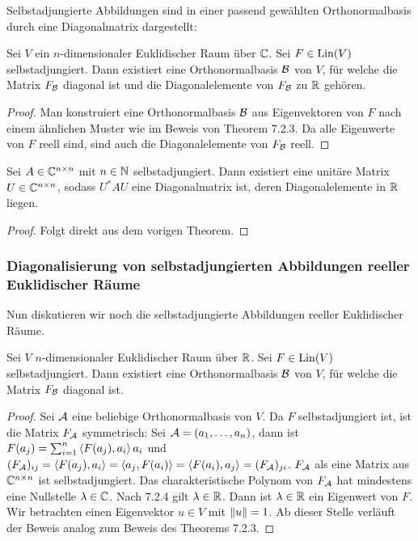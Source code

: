 Selbstadjungierte Abbildungen sind in einer passend gewählten Orthonormalbasis durch eine Diagonalmatrix dargestellt: 

\begin{thm}
	Sei $ V $ ein $ n $-dimensionaler Euklidischer Raum über $ \mathbb C $. Sei $ F \in \operatorname{Lin}(V) $ selbstadjungiert. Dann existiert eine Orthonormalbasis $ \mathcal{B} $ von $ V $, für welche die Matrix $ F_{\mathcal{B}} $ diagonal ist und die Diagonalelemente von $ F_{\mathcal{B}} $ zu $ \mathbb R $ gehören.
\end{thm}
\begin{proof}
	Man konstruiert eine Orthonormalbasis $ \mathcal{B} $ aus Eigenvektoren von $ F $ nach einem ähnlichen Muster wie im Beweis von Theorem 7.2.3. %
	Da alle Eigenwerte von $ F $ reell sind, sind auch die Diagonalelemente von $ F_{\mathcal{B}} $ reell.
\end{proof}

\begin{klr}
	Sei $ A \in \mathbb C^{n \times n} $ mit $ n \in \mathbb N $ selbstadjungiert. Dann existiert eine unitäre Matrix $ U \in \mathbb C^{n \times n} $, sodass $ U^\ast A U $ eine Diagonalmatrix ist, deren Diagonalelemente in $ \mathbb R $ liegen.
\end{klr}
\begin{proof}
	Folgt direkt aus dem vorigen Theorem.
\end{proof}

\subsubsection{Diagonalisierung von selbstadjungierten Abbildungen reeller Euklidischer Räume}

Nun diskutieren wir noch die selbstadjungierte Abbildungen reeller Euklidischer Räume. %

\begin{thm}
	Sei $ V $ $ n $-dimensionaler Euklidischer Raum über $ \mathbb R $. Sei $ F \in \operatorname{Lin}(V) $ selbstadjungiert. Dann existiert eine Orthonormalbasis $ \mathcal{B} $ von $ V $, für welche die Matrix $ F_{\mathcal{B}} $ diagonal ist.
\end{thm}
\begin{proof}
	Sei $ \mathcal{A} $ eine beliebige Orthonormalbasis von $ V $. Da $ F $ selbstadjungiert ist, ist die Matrix $ F_{\mathcal{A}} $ symmetrisch: Sei $ \mathcal{A} = (a_1, \ldots, a_n) $, dann ist $ F(a_j) = \sum_{i=1}^{n} \left\langle F(a_j),a_i \right\rangle a_i $ und $ (F_{\mathcal{A}}){}_{ij} = \left\langle F(a_j),a_i \right\rangle = \left\langle a_j,F(a_i) \right\rangle = \left\langle F(a_i),a_j \right\rangle = (F_{\mathcal{A}}){}_{ji} $. $ F_{\mathcal{A}} $ als eine Matrix aus $ \mathbb C^{n \times n} $ ist selbstadjungiert. Das charakteristische Polynom von $ F_{\mathcal{A}} $ hat mindestens eine Nullstelle $ \lambda \in \mathbb C $. Nach 7.2.4 %
	gilt $ \lambda \in \mathbb R $. Dann ist $ \lambda \in \mathbb R $ ein Eigenwert von $ F $. Wir betrachten einen Eigenvektor $ u \in V $ mit $ \left\| u \right\| = 1 $. Ab dieser Stelle verläuft der Beweis analog zum Beweis des Theorems 7.2.3. %
\end{proof}

